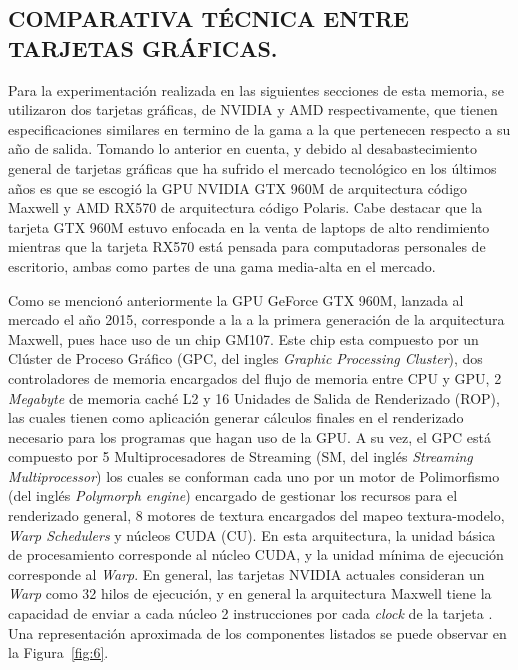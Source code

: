 
\subsection{COMPARATIVA TÉCNICA ENTRE TARJETAS GRÁFICAS.}


Para la experimentación realizada en las siguientes secciones de esta memoria, se utilizaron dos tarjetas gráficas, de NVIDIA y AMD respectivamente, que tienen especificaciones similares en termino de la gama a la que pertenecen respecto a su año de salida. 
Tomando lo anterior en cuenta, y debido al desabastecimiento general de tarjetas gráficas que ha sufrido el mercado tecnológico en los últimos años es que se escogió la GPU NVIDIA GTX 960M de arquitectura código Maxwell y AMD RX570 de arquitectura código Polaris.
Cabe destacar que la tarjeta GTX 960M estuvo enfocada en la venta de laptops de alto rendimiento~\cite{gtx960m} mientras que la tarjeta RX570 está pensada para computadoras personales de escritorio, ambas como partes de una gama media-alta en el mercado.

Como se mencionó anteriormente la GPU GeForce GTX 960M, lanzada al mercado el año 2015, corresponde a la a la primera generación de la arquitectura Maxwell, pues hace uso de un chip GM107.
Este chip esta compuesto por un Clúster de Proceso Gráfico (GPC, del ingles \textit{Graphic Processing Cluster}), dos controladores de memoria encargados del flujo de memoria entre CPU y GPU, 2 \textit{Megabyte} de memoria caché L2 y 16 Unidades de Salida de Renderizado (ROP), las cuales tienen como aplicación generar cálculos finales en el renderizado necesario para los programas que hagan uso de la GPU.
A su vez, el GPC está compuesto por 5 Multiprocesadores de Streaming (SM, del inglés \textit{Streaming Multiprocessor}) los cuales se conforman cada uno por un motor de Polimorfismo (del inglés \textit{Polymorph engine}) encargado de gestionar los recursos para el renderizado general, 8 motores de textura encargados del mapeo textura-modelo, \textit{Warp Schedulers} y núcleos CUDA (CU).
En esta arquitectura, la unidad básica de procesamiento corresponde al núcleo CUDA, y la unidad mínima de ejecución corresponde al \textit{Warp}.
En general, las tarjetas NVIDIA actuales consideran un \textit{Warp} como 32 hilos de ejecución, y en general la arquitectura Maxwell tiene la capacidad de enviar a cada núcleo 2 instrucciones por cada \textit{clock} de la tarjeta \cite{nwhitepaper}.
Una representación aproximada de los componentes listados se puede observar en la Figura~\ref{fig:6}.


